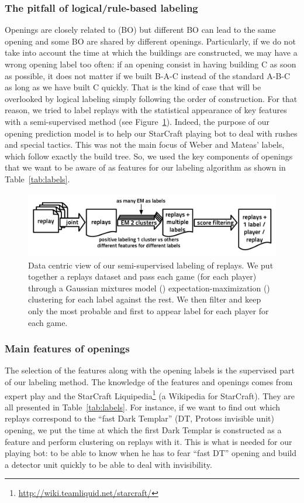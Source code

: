 \subsubsection{The pitfall of logical/rule-based labeling}
Openings are closely related to  (BO) but different BO can lead to the same opening and some BO are shared by different openings. Particularly, if we do not take into account the time at which the buildings are constructed, we may have a wrong opening label too often: if an opening consist in having building C as soon as possible, it does not matter if we built B-A-C instead of the standard A-B-C as long as we have built C quickly. That is the kind of case that will be overlooked by logical labeling simply following the order of construction. For that reason, we tried to label replays with the statistical appearance of key features with a semi-supervised method (see Figure~\ref{fig:replays_labeling}). Indeed, the purpose of our opening prediction model is to help our StarCraft playing bot to deal with rushes and special tactics. This was not the main focus of Weber and Mateas' labels, which follow exactly the build tree. So, we used the key components of openings that we want to be aware of as features for our labeling algorithm as shown in Table~\ref{tab:labels}.

\begin{figure}[h]
\centerline{\includegraphics[width=0.80\columnwidth]{images/replays_labeling.pdf}}
\caption{Data centric view of our semi-supervised labeling of replays. 
We put together a replays dataset and pass each game (for each player) through a Gaussian mixtures model () expectation-maximization () clustering for each label against the rest. We then filter and keep only the most probable and first to appear  label for each player for each game.}
\label{fig:replays_labeling}
\end{figure}

\subsubsection{Main features of openings}

The selection of the features along with the opening labels is the supervised part of our labeling method. The knowledge of the features and openings comes from expert play and the StarCraft Liquipedia\footnote{\url{http://wiki.teamliquid.net/starcraft/}} (a Wikipedia for StarCraft). They are all presented in Table~\ref{tab:labels}. For instance, if we want to find out which replays correspond to the ``fast Dark Templar'' (DT, Protoss invisible unit) opening, we put the time at which the first Dark Templar is constructed as a feature and perform clustering on replays with it. This is what is needed for our playing bot: to be able to know when he has to fear ``fast DT'' opening and build a detector unit quickly to be able to deal with invisibility.

